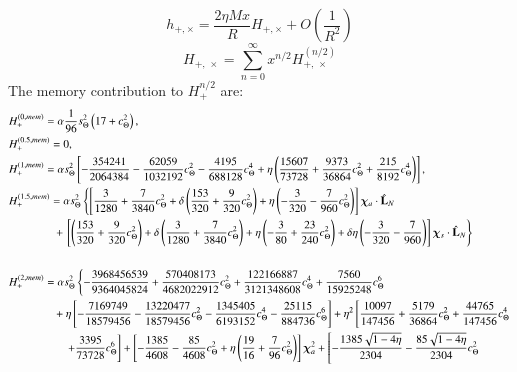 \documentclass[twocolumn,showpacs,aps,prd,nobibnotes,floatfix]{revtex4-1}
\begin{document}
\begin{widetext}
\begin{equation}
h_{+,\times} = \frac{2\eta Mx}{R}H_{+,\times} + O\left(\frac{1}{R^2}\right)
\end{equation}
\begin{equation}
	H_{+,\,\times}= \sum_{n=0}^{\infty}x^{n/2}H_{+,\,\times}^{(n/2)}
\end{equation}
The memory contribution to $H_{+}^{n/2} $ are:
\begin{subequations}
\begin{align}
	& H_{+}^{(0,mem)}=\alpha\frac{1}{96}s_{\Theta}^2\left(17 + c_{\Theta}^2\right),\\
	& H_{+}^{(0.5,mem)}=0,\\
	& H_{+}^{(1,mem)}=\alpha s_{\Theta}^2\left[-\frac{354241}{2064384} - \frac{62059}{1032192}c_{\Theta}^2 - \frac{4195}{688128}c_{\Theta}^4 + \eta\left(\frac{15607}{73728} + \frac{9373}{36864}c_{\Theta}^2 +\frac{215}{8192}c_{\Theta}^4\right)\right],\\
	& H_{+}^{(1.5,mem)}=\alpha s_{\Theta}^2\left\{\left[\frac{3}{1280}  + \frac{7}{3840}c_{\Theta}^2 +  \delta\left(\frac{153}{320} + \frac{9}{320}c_{\Theta}^2\right) +\eta \left(-\frac{3}{320}-\frac{7}{960}c_{\Theta}^2\right)\right]\chiadL\right.\nonumber\\
	& \qquad\qquad+\left.\left[\left(\frac{153}{320} + \frac{9}{320}c_{\Theta}^2\right) + \delta\left(\frac{3}{1280} + \frac{7}{3840}c_{\Theta}^2\right) + \eta\left(-\frac{3}{80} +\frac{23}{240}c_{\Theta}^2\right) + \delta\eta\left(-\frac{3}{320}-\frac{7}{960}\right)\right]\chisdL\right\}\nonumber\\
	\\
	& H_{+}^{(2,mem)} =\alpha s_{\Theta}^2\left\{-\frac{3968456539}{9364045824} + \frac{570408173}{4682022912}c_{\Theta}^2 + \frac{122166887}{3121348608}c_{\Theta}^4 + \frac{7560}{15925248}c_{\Theta}^6 \right.\nonumber\\
	& \qquad\qquad + \eta\left[-\frac{7169749}{18579456} - \frac{13220477}{18579456}c_{\Theta}^2 -\frac{1345405}{6193152}c_{\Theta}^4 - \frac{25115}{884736}c_{\Theta}^6\right] + \eta^2\left[\frac{10097}{147456} + \frac{5179}{36864}c_{\Theta}^2 + \frac{44765}{147456}c_{\Theta}^4\right.\nonumber\\
	& \qquad\qquad\quad \left.+ \frac{3395}{73728}c_{\Theta}^6\right] + \left[-\frac{1385}{4608}-\frac{85}{4608}c_{\Theta}^2 +\eta\left(\frac{19}{16} + \frac{7}{96}c_{\Theta}^2\right)\right]\chiaSqr + \left[-\frac{1385\sqrt{1-4\eta}}{2304} - \frac{85\sqrt{1-4\eta}}{2304}c_{\Theta}^2\right.\nonumber\\

\end{align}
\end{subequations}
\end{widetext}
\end{document}
